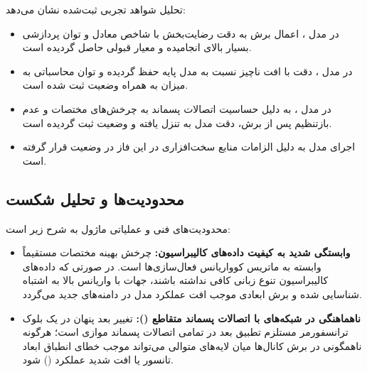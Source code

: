 تحلیل شواهد تجربی ثبت‌شده نشان می‌دهد:
\begin{itemize}
    \item در مدل ، اعمال برش به دقت رضایت‌بخش  با شاخص  معادل  و توان پردازشی بسیار بالای  انجامیده و معیار قبولی  حاصل گردیده است.
    \item در مدل ، دقت  با افت ناچیز  نسبت به مدل پایه حفظ گردیده و توان محاسباتی به میزان  به همراه وضعیت  ثبت شده است.
    \item در مدل ، به دلیل حساسیت اتصالات پسماند به چرخش‌های مختصات و عدم بازتنظیم پس از برش، دقت مدل به  تنزل یافته و وضعیت  ثبت گردیده است.
    \item اجرای مدل  به دلیل الزامات منابع سخت‌افزاری در این فاز در وضعیت  قرار گرفته است.
\end{itemize}

\subsection{محدودیت‌ها و تحلیل شکست}
محدودیت‌های فنی و عملیاتی ماژول  به شرح زیر است:
\begin{itemize}
    \item \textbf{وابستگی شدید به کیفیت داده‌های کالیبراسیون:} چرخش بهینه مختصات مستقیماً وابسته به ماتریس کوواریانس فعال‌سازی‌ها است. در صورتی که داده‌های کالیبراسیون تنوع زبانی کافی نداشته باشند، جهات با واریانس بالا به اشتباه شناسایی شده و برش ابعادی موجب افت عملکرد مدل در دامنه‌های جدید می‌گردد.
    \item \textbf{ناهماهنگی در شبکه‌های با اتصالات پسماند متقاطع ():} تغییر بعد پنهان در یک بلوک ترانسفورمر مستلزم تطبیق بعد در تمامی اتصالات پسماند موازی است؛ هرگونه ناهمگونی در برش کانال‌ها میان لایه‌های متوالی می‌تواند موجب خطای انطباق ابعاد تانسور یا افت شدید عملکرد () شود.
\end{itemize}
